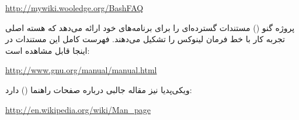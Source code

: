 \begin{latin}
\url{http://mywiki.wooledge.org/BashFAQ}
\end{latin}

پروژه گنو () مستندات گسترده‌ای را برای برنامه‌های خود ارائه می‌دهد که هسته اصلی تجربه کار با خط فرمان لینوکس را تشکیل می‌دهند. فهرست کامل این مستندات در اینجا قابل مشاهده است:

\begin{latin}
\url{http://www.gnu.org/manual/manual.html}
\end{latin}

ویکی‌پدیا نیز مقاله جالبی درباره صفحات راهنما () دارد:

\begin{latin}
\url{http://en.wikipedia.org/wiki/Man_page}
\end{latin}
